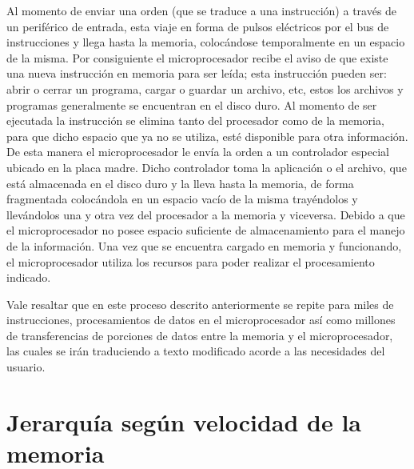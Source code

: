 \documentclass{article}
\begin{document}
\vspace{0.5cm}

Al momento de enviar una orden (que se traduce a una instrucción) a través de un periférico de entrada, esta viaje en forma de pulsos eléctricos por el bus de instrucciones y  llega hasta la memoria, colocándose temporalmente en un espacio de la misma. Por consiguiente el microprocesador recibe el aviso de que existe una nueva instrucción en memoria para ser leída; esta instrucción pueden ser: abrir o cerrar un programa, cargar o guardar un archivo, etc, estos los archivos y programas generalmente se encuentran en el disco duro. Al momento de ser ejecutada la instrucción se elimina tanto del procesador como de la memoria, para que dicho espacio que ya no se utiliza, esté disponible para otra información. De esta manera el microprocesador le envía la orden a un controlador especial ubicado en la placa madre. Dicho controlador toma la aplicación o el archivo, que está almacenada en el disco duro y la lleva hasta la memoria, de forma fragmentada colocándola en un espacio vacío de la misma trayéndolos y llevándolos una y otra vez del procesador a la memoria y viceversa. Debido a que el microprocesador no posee espacio suficiente de almacenamiento para el manejo de la información. Una vez que se encuentra cargado en memoria y funcionando, el microprocesador utiliza los  recursos para poder realizar el  procesamiento indicado. 

\vspace{0.5cm}

Vale resaltar que en este proceso descrito anteriormente se repite para miles de instrucciones, procesamientos de datos en el microprocesador así como millones de transferencias de porciones de datos entre la memoria y el microprocesador, las cuales se irán traduciendo a texto modificado acorde a las necesidades del usuario.

\vspace{0.5cm}


\section{Jerarquía según velocidad de la memoria} \label{contenido}



\end{document}
